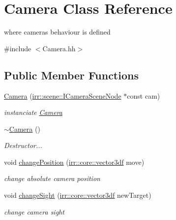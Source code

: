 \hypertarget{classCamera}{}\section{Camera Class Reference}
\label{classCamera}


where cameras behaviour is defined  




{\ttfamily \#include $<$Camera.\+hh$>$}

\subsection*{Public Member Functions}
\begin{DoxyCompactItemize}
\item 
\hyperlink{classCamera_a4ffc956956f49716d7fa3bff2591cd3a}{Camera} (\hyperlink{classirr_1_1scene_1_1ICameraSceneNode}{irr\+::scene\+::\+I\+Camera\+Scene\+Node} $\ast$const cam)
\begin{DoxyCompactList}\small\item\em instanciate \hyperlink{classCamera}{Camera} \end{DoxyCompactList}\item 
\mbox{\label{classCamera_ad1897942d0ccf91052386388a497349f}} 
\hyperlink{classCamera_ad1897942d0ccf91052386388a497349f}{$\sim$\+Camera} ()
\begin{DoxyCompactList}\small\item\em Destructor... \end{DoxyCompactList}\item 
void \hyperlink{classCamera_ad7d58a7f1ab2b31f120a0bdad677b300}{change\+Position} (\hyperlink{namespaceirr_1_1core_a06f169d08b5c429f5575acb7edbad811}{irr\+::core\+::vector3df} move)
\begin{DoxyCompactList}\small\item\em change absolute camera position \end{DoxyCompactList}\item 
void \hyperlink{classCamera_a8c11f289be05671191a4f91288155685}{change\+Sight} (\hyperlink{namespaceirr_1_1core_a06f169d08b5c429f5575acb7edbad811}{irr\+::core\+::vector3df} new\+Target)
\begin{DoxyCompactList}\small\item\em change camera sight \end{DoxyCompactList}\end{DoxyCompactItemize}


